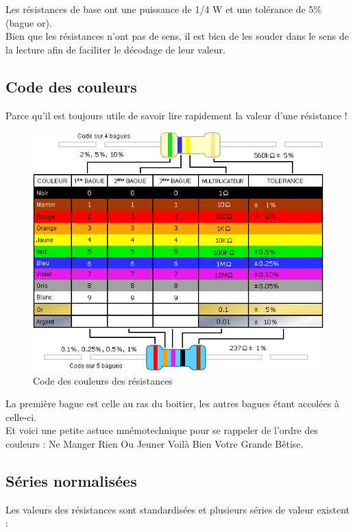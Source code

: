 \documentclass[a4paper]{article}
\begin{document}
Les résistances de base ont une puissance de 1/4 W et une tolérance de 5\% (bague or).\\
Bien que les résistances n'ont pas de sens, il est bien de les souder dans le sens de la lecture afin de faciliter le décodage de leur valeur.

\subsection{Code des couleurs}

Parce qu'il est toujours utile de savoir lire rapidement la valeur d'une résistance !

\begin{figure}[H]
	\centering
	\includegraphics[scale=0.75]{Images/Code_couleur_resistance.png}
	\caption{Code des couleurs des résistances
		\label{Code_couleur_resistance}}
\end{figure}

La première bague est celle au ras du boitier, les autres bagues étant accolées à celle-ci.\\
Et voici une petite astuce mnémotechnique pour se rappeler de l'ordre des couleurs : \og{}Ne Manger Rien Ou Jeuner Voilà Bien Votre Grande Bêtise\fg{}.

\subsection{Séries normalisées}

Les valeurs des résistances sont standardisées et plusieurs séries de valeur existent :
\end{document}
